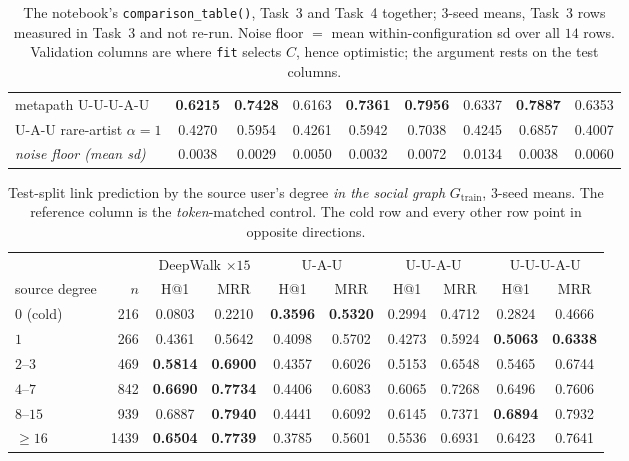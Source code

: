 \begin{table}[htbp]
\begin{tabular}{@{}lcccccccc@{}}
metapath \textsf{U-U-U-A-U} & \textbf{0.6215} & \textbf{0.7428} & 0.6163 & \textbf{0.7361} & \textbf{0.7956} & 0.6337 & \textbf{0.7887} & 0.6353 \\
\textsf{U-A-U} rare-artist $\alpha{=}1$ & 0.4270 & 0.5954 & 0.4261 & 0.5942 & 0.7038 & 0.4245 & 0.6857 & 0.4007 \\
\midrule
\textit{noise floor (mean sd)} & 0.0038 & 0.0029 & 0.0050 & 0.0032 & 0.0072 & 0.0134 & 0.0038 & 0.0060 \\
\bottomrule
\end{tabular}
\caption{The notebook's \texttt{comparison\_table()}, Task~3 and Task~4 together; $3$-seed
means, Task~3 rows measured in Task~3 and not re-run.  Noise floor $=$ mean
within-configuration sd over all $14$ rows.  Validation columns are where \texttt{fit}
selects $C$, hence optimistic; the argument rests on the test columns.}
\label{p2:tab:main}
\end{table}

\begin{table}[htbp]
\centering\footnotesize
\setlength{\tabcolsep}{4.5pt}
\begin{tabular}{@{}lrcccccccc@{}}
\toprule
& & \multicolumn{2}{c}{DeepWalk $\times15$} & \multicolumn{2}{c}{\textsf{U-A-U}}
  & \multicolumn{2}{c}{\textsf{U-U-A-U}} & \multicolumn{2}{c}{\textsf{U-U-U-A-U}} \\
\cmidrule(lr){3-4}\cmidrule(lr){5-6}\cmidrule(lr){7-8}\cmidrule(lr){9-10}
source degree & $n$ & H@1 & MRR & H@1 & MRR & H@1 & MRR & H@1 & MRR \\
\midrule
$0$ (cold) & 216 & 0.0803 & 0.2210 & \textbf{0.3596} & \textbf{0.5320} & 0.2994 & 0.4712 & 0.2824 & 0.4666 \\
$1$ & 266 & 0.4361 & 0.5642 & 0.4098 & 0.5702 & 0.4273 & 0.5924 & \textbf{0.5063} & \textbf{0.6338} \\
$2$--$3$ & 469 & \textbf{0.5814} & \textbf{0.6900} & 0.4357 & 0.6026 & 0.5153 & 0.6548 & 0.5465 & 0.6744 \\
$4$--$7$ & 842 & \textbf{0.6690} & \textbf{0.7734} & 0.4406 & 0.6083 & 0.6065 & 0.7268 & 0.6496 & 0.7606 \\
$8$--$15$ & 939 & 0.6887 & \textbf{0.7940} & 0.4441 & 0.6092 & 0.6145 & 0.7371 & \textbf{0.6894} & 0.7932 \\
$\ge 16$ & 1439 & \textbf{0.6504} & \textbf{0.7739} & 0.3785 & 0.5601 & 0.5536 & 0.6931 & 0.6423 & 0.7641 \\
\bottomrule
\end{tabular}
\caption{Test-split link prediction by the source user's degree \emph{in the social graph}
$G_{\mathrm{train}}$, $3$-seed means.  The reference column is the \emph{token}-matched
control.  The cold row and every other row point in opposite directions.}
\label{p2:tab:degree}
\end{table}


